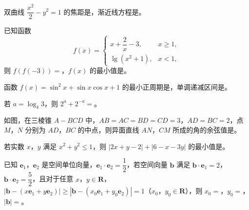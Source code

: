 \begin{question}
双曲线 \(\dfrac{x^2}{2}-y^2=1\) 的焦距是\gkblank{}，渐近线方程是\gkblank{}。

\end{question}
\begin{question}
已知函数
\nopagebreak[4]
\[
f(x)=\begin{cases}
x+\dfrac{2}{x}-3, & x\geqslant1,\\
\lg\left(x^2+1\right), & x<1,
\end{cases}
\]
则 \(f(f(-3))=\)\gkblank{}，\(f(x)\) 的最小值是\gkblank{}。

\end{question}
\begin{question}
函数 \(f(x)=\sin^2x+\sin x\cos x+1\) 的最小正周期是\gkblank{}，单调递减区间是\gkblank{}。

\end{question}
\begin{question}
若 \(a=\log_4 3\)，则 \(2^a+2^{-a}=\)\gkblank{}。

\Needspace{0.4\textheight}
\end{question}
\begin{question}
如图，在三棱锥 \(A-BCD\) 中，\(AB=AC=BD=CD=3\)，\(AD=BC=2\)，点 \(M\)，\(N\) 分别为 \(AD\)，\(BC\) 的中点，则异面直线 \(AN\)，\(CM\) 所成的角的余弦值是\gkblank{}。
\nopagebreak[4]
\begin{center}\end{center}
\nopagebreak[4]
\end{question}
\begin{question}
若实数 \(x\)，\(y\) 满足 \(x^2+y^2\leqslant1\)，则 \(|2x+y-2|+|6-x-3y|\) 的最小值是\gkblank{}。

\end{question}
\begin{question}
已知 \(\boldsymbol{e}_1\)，\(\boldsymbol{e}_2\) 是空间单位向量，\(\boldsymbol{e}_1\cdot\boldsymbol{e}_2=\dfrac12\)，若空间向量 \(\boldsymbol{b}\) 满足 \(\boldsymbol{b}\cdot\boldsymbol{e}_1=2\)，\(\boldsymbol{b}\cdot\boldsymbol{e}_2=\dfrac52\)，且对于任意 \(x\)，\(y\in\mathbf{R}\)，\(\left|\boldsymbol{b}-(x\boldsymbol{e}_1+y\boldsymbol{e}_2)\right|\geqslant\left|\boldsymbol{b}-(x_0\boldsymbol{e}_1+y_0\boldsymbol{e}_2)\right|=1\)（\(x_0\)，\(y_0\in\mathbf{R}\)），则 \(x_0=\)\gkblank{}，\(y_0=\)\gkblank{}，\(|\boldsymbol{b}|=\)\gkblank{}。

\end{question}


